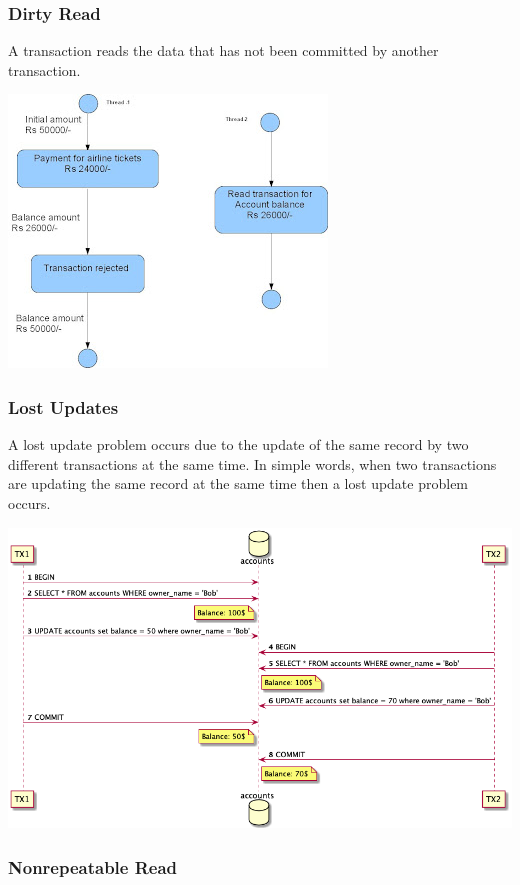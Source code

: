 \subsubsection{Dirty Read}

A transaction reads the data that has not been committed by another transaction.

\includegraphics{./images/chapter-tx/DirtyRead.JPG}

\subsubsection{Lost Updates}

A lost update problem occurs due to the update of the same record by two different transactions at the same time. In simple words, when two transactions are updating the same record at the same time then a lost update problem occurs.

\includegraphics[width=\textwidth]{./images/chapter-tx/lost_update.png}

\subsubsection{Nonrepeatable Read}

